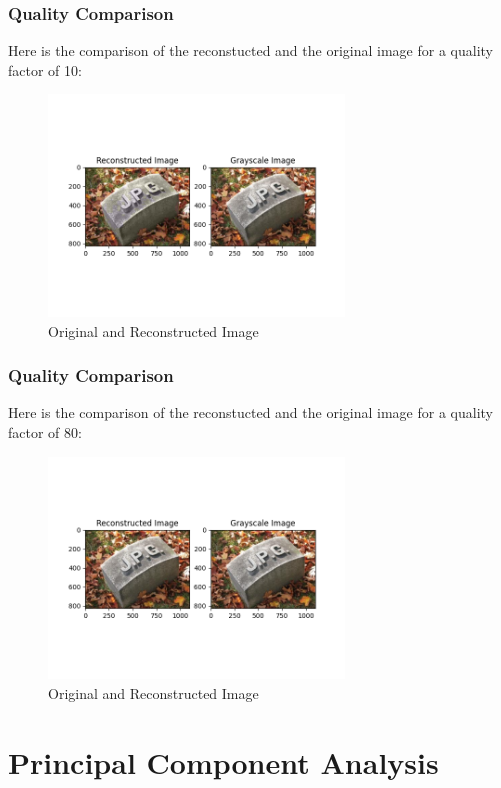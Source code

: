 \documentclass[Serif, 10pt, brown]{beamer}
\theoremstyle{example}
\theoremstyle{plain}
\begin{document}
\begin{frame}
	\frametitle{Quality Comparison}
	Here is the comparison of the reconstucted and the original image for a quality factor of 10:
	\begin{figure}
		\centering
		\includegraphics[width=0.7\textwidth]{../results/Quality: 10_comparison_colour.png}
		\caption{Original and Reconstructed Image}
	\end{figure}
\end{frame}


\begin{frame}
	\frametitle{Quality Comparison}
	Here is the comparison of the reconstucted and the original image for a quality factor of 80:
	\begin{figure}
		\centering
		\includegraphics[width=0.7\textwidth]{../results/Quality: 80_comparison_colour.png}
		\caption{Original and Reconstructed Image}
	\end{figure}
\end{frame}
\section{Principal Component Analysis}
\end{document}
